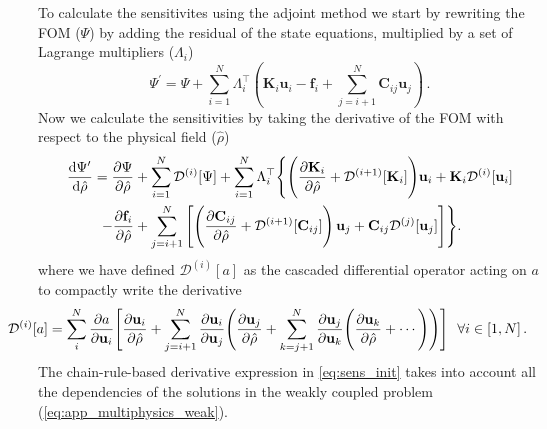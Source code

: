 To calculate the sensitivites using the adjoint method we start by rewriting the FOM ($\Psi$) by adding the residual
of the state equations, multiplied by a set of Lagrange multipliers ($\Lambda_i$)
\begin{equation}\label{eq:adj_init}
    \Psi^\prime =\Psi + \sum^N_{i=1} \Lambda_{i}^{\top}\left(\mathbf{K}_i \mathbf{u}_i -\mathbf{f}_i + \sum^N_{j=i+1} \mathbf{C}_{ij} \mathbf{u}_j \right)\,.
\end{equation}
Now we calculate the sensitivities by taking the derivative of the FOM with respect to the physical field ($\hat{\rho}$)
\begin{align}\label{eq:sens_init}
    \frac{\mathop{}\!\text{d} \Psi^\prime}{\mathop{}\!\text{d} \hat{\rho}} 
    = \frac{\partial \Psi}{\partial \hat{\rho}} 
    &+ \sum_{i=1}^N \mathcal{D}^{(i)}[\Psi]
    + \sum_{i=1}^N \Lambda_i^\top \Bigg\{\Bigg(
        \frac{\partial \mathbf{K}_i}{\partial \hat{\rho}} 
        + \mathcal{D}^{(i+1)}[\mathbf{K}_i]\Bigg) \mathbf{u}_i 
        + \mathbf{K}_i \mathcal{D}^{(i)}[\mathbf{u}_i] \nonumber \\
        - \frac{\partial \mathbf{f}_i}{\partial \hat{\rho}} 
        &+ \sum_{j=i+1}^{N} \Bigg[ \Bigg(
            \frac{\partial \mathbf{C}_{ij}}{\partial \hat{\rho}} + 
            \mathcal{D}^{(i+1)}[\mathbf{C}_{ij}] \Bigg)\, \mathbf{u}_j 
            + \mathbf{C}_{ij} \mathcal{D}^{(j)}[\mathbf{u}_j] 
        \Bigg]
    \Bigg\}. 
\end{align}
where we have defined $\mathcal{D}^{(i)}[a]$ as the cascaded differential operator acting on $a$ to compactly write the derivative
\begin{align}
    \hspace*{-0.775cm}\mathcal{D}^{(i)}[a] &= \sum^N_{i} \frac{\partial a}{\partial \mathbf{u}_i} \Bigg[ \frac{\partial \mathbf{u}_i}{\partial \hat{\rho}} + 
    \sum_{j=i+1}^{N} \frac{\partial \mathbf{u}_i}{\partial \mathbf{u}_j} \Bigg( \frac{\partial \mathbf{u}_j}{\partial \hat{\rho}} + 
    \sum_{k=j+1}^{N} \frac{\partial \mathbf{u}_j}{\partial \mathbf{u}_k} \Bigg( \frac{\partial \mathbf{u}_k}{\partial \hat{\rho}} + \cdots \Bigg) \Bigg) \Bigg] \,\,\,\, \forall i \in [1, N] \,.
\end{align}
The chain-rule-based derivative expression in \eqref{eq:sens_init} takes into account all the dependencies of the solutions in the weakly coupled problem (\eqref{eq:app_multiphysics_weak}).


